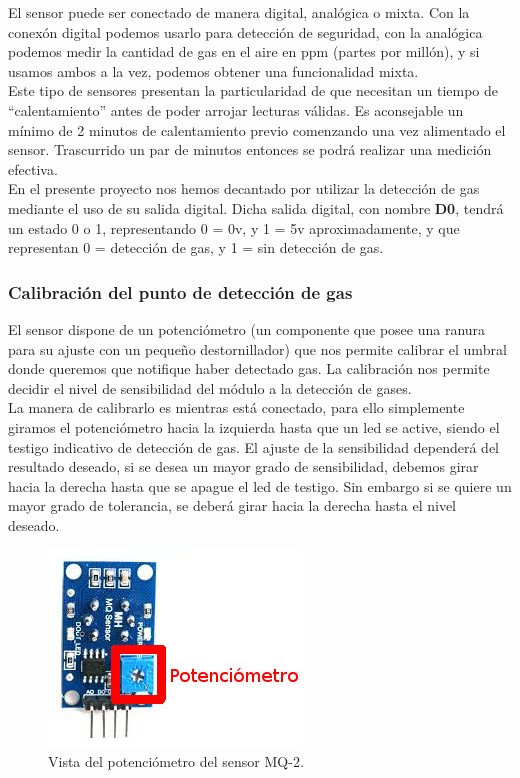 El sensor puede ser conectado de manera digital, analógica o mixta. Con la conexón digital podemos usarlo para detección de seguridad, con la analógica podemos medir la cantidad 
de gas en el aire en ppm (partes por millón), y si usamos ambos a la vez, podemos obtener una funcionalidad mixta.\\

Este tipo de sensores presentan la particularidad de que necesitan un tiempo de “calentamiento” antes de poder arrojar lecturas válidas. Es aconsejable un mínimo de 2 minutos
de calentamiento previo comenzando una vez alimentado el sensor. Trascurrido un par de minutos entonces se podrá realizar una medición efectiva.\\

En el presente proyecto nos hemos decantado por utilizar la detección de gas mediante el uso de su salida digital. Dicha salida digital, con nombre \textbf{D0}, tendrá un estado
0 o 1, representando 0 = 0v, y 1 = 5v aproximadamente, y que representan 0 = detección de gas, y 1 = sin detección de gas. 

\subsubsection{ Calibración del punto de detección de gas}

El sensor dispone de un potenciómetro (un componente que posee una ranura para su ajuste con un pequeño destornillador) que nos permite calibrar el umbral donde queremos que
notifique haber detectado gas. La calibración nos permite decidir el nivel de sensibilidad del módulo a la detección de gases.\\

La manera de calibrarlo es mientras está conectado, para ello simplemente giramos el potenciómetro hacia la izquierda hasta que un led se active, siendo
el testigo indicativo de detección de gas. El ajuste de la sensibilidad dependerá del resultado deseado, si se desea un mayor grado de sensibilidad, debemos girar hacia la derecha
hasta que se apague el led de testigo. Sin embargo si se quiere un mayor grado de tolerancia, se deberá girar hacia la derecha hasta el nivel deseado.\\

\begin{figure}[H]
  \begin{center}
    \includegraphics[scale=0.6]{imagenes/mq2_trasera.jpeg}
  \end{center}
  \caption{Vista del potenciómetro del sensor MQ-2.}
  \label{figura:sensor_mq_2_potenciometro}
\end{figure}

